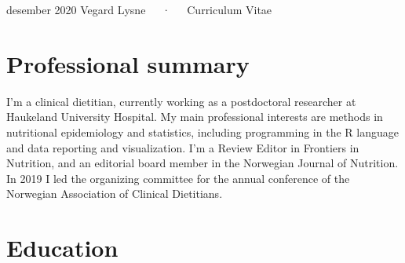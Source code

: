 \documentclass[11pt, a4paper]{awesome-cv}
\begin{document}
\makecvheader

\makecvfooter
  {desember 2020}
    {Vegard Lysne~~~·~~~Curriculum Vitae}
  {\thepage}





\hypertarget{professional-summary}{%
\section{Professional summary}\label{professional-summary}}

I'm a clinical dietitian, currently working as a postdoctoral researcher
at Haukeland University Hospital. My main professional interests are
methods in nutritional epidemiology and statistics, including
programming in the R language and data reporting and visualization. I'm
a Review Editor in Frontiers in Nutrition, and an editorial board member
in the Norwegian Journal of Nutrition. In 2019 I led the organizing
committee for the annual conference of the Norwegian Association of
Clinical Dietitians.

\hypertarget{education}{%
\section{Education}\label{education}}

\begin{cventries}
\end{cventries}
\end{document}
